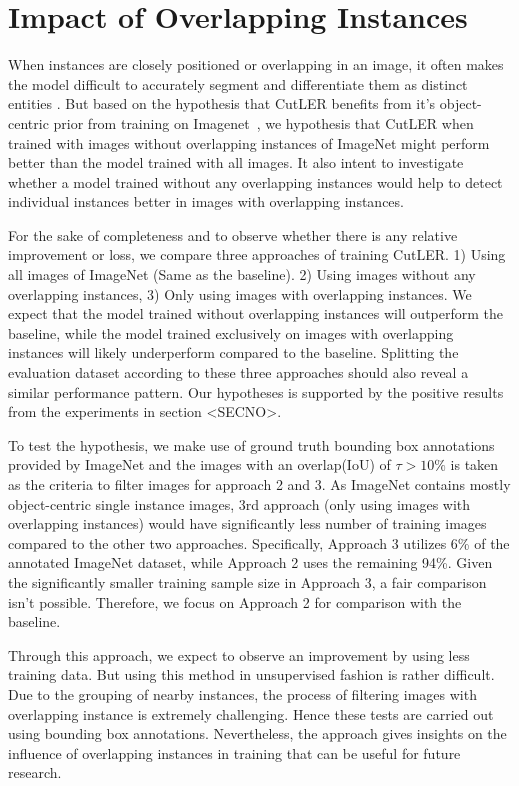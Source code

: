 \section{Impact of Overlapping Instances}
\label{section:analysis_ol_instancs}
When instances are closely positioned or overlapping in an image, it often makes the model difficult to accurately segment and differentiate them as distinct entities \cite{kara2022image}. But based on the hypothesis that CutLER benefits from it's object-centric prior from training on Imagenet~\cite{engstler2023understanding}, we hypothesis that CutLER when trained with images without overlapping instances of ImageNet might perform better than the model trained with all images. It also intent to investigate whether a model trained without any overlapping instances would help to detect individual instances better in images with overlapping instances.

For the sake of completeness and to observe whether there is any relative improvement or loss, we compare three approaches of training CutLER. 1) Using all images of ImageNet (Same as the baseline). 2) Using images without any overlapping instances, 3)  Only using images with overlapping instances. We expect that the model trained without overlapping instances will outperform the baseline, while the model trained exclusively on images with overlapping instances will likely underperform compared to the baseline. Splitting the evaluation dataset according to these three approaches should also reveal a similar performance pattern. Our hypotheses is supported by the positive results from the experiments in section <SECNO>.

To test the hypothesis, we make use of ground truth bounding box annotations provided by ImageNet and the images with an overlap(IoU) of \(\tau > \text{10\%}\) is taken as the criteria to filter images for approach 2 and 3. As ImageNet contains mostly object-centric single instance images, 3rd approach (only using images with overlapping instances) would have significantly less number of training images compared to the other two approaches. Specifically, Approach 3 utilizes 6\% of the annotated ImageNet dataset, while Approach 2 uses the remaining 94\%. Given the significantly smaller training sample size in Approach 3, a fair comparison isn't possible. Therefore, we focus on Approach 2 for comparison with the baseline.

Through this approach, we expect to observe an improvement by using less training data. But using this method in unsupervised fashion is rather difficult. Due to the grouping of nearby instances, the process of filtering images with overlapping instance is extremely challenging. Hence these tests are carried out using bounding box annotations. Nevertheless, the approach gives insights on the influence of overlapping instances in training that can be useful for future research.

